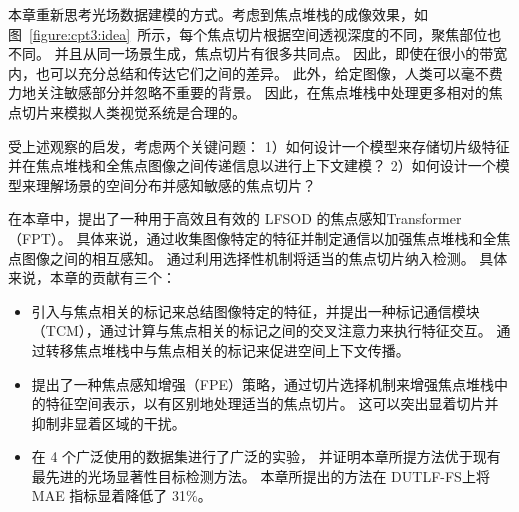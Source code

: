 本章重新思考光场数据建模的方式。考虑到焦点堆栈的成像效果，如图~\ref{figure:cpt3:idea}~所示，每个焦点切片根据空间透视深度的不同，聚焦部位也不同。 并且从同一场景生成，焦点切片有很多共同点。
因此，即使在很小的带宽内，也可以充分总结和传达它们之间的差异。 此外，给定图像，人类可以毫不费力地关注敏感部分并忽略不重要的背景。 因此，在焦点堆栈中处理更多相对的焦点切片来模拟人类视觉系统是合理的。 


受上述观察的启发，考虑两个关键问题：
1）如何设计一个模型来存储切片级特征并在焦点堆栈和全焦点图像之间传递信息以进行上下文建模？ 
2）如何设计一个模型来理解场景的空间分布并感知敏感的焦点切片？ 

在本章中，提出了一种用于高效且有效的 LFSOD 的焦点感知Transformer（FPT）。 
具体来说，通过收集图像特定的特征并制定通信以加强焦点堆栈和全焦点图像之间的相互感知。 
通过利用选择性机制将适当的焦点切片纳入检测。 
具体来说，本章的贡献有三个：



\begin{itemize}
	\item 引入与焦点相关的标记来总结图像特定的特征，并提出一种标记通信模块（TCM），通过计算与焦点相关的标记之间的交叉注意力来执行特征交互。 通过转移焦点堆栈中与焦点相关的标记来促进空间上下文传播。 
	
	\item 提出了一种焦点感知增强（FPE）策略，通过切片选择机制来增强焦点堆栈中的特征空间表示，以有区别地处理适当的焦点切片。	这可以突出显着切片并抑制非显着区域的干扰。 
	
	\item 在 4 个广泛使用的数据集进行了广泛的实验，
	并证明本章所提方法优于现有最先进的光场显著性目标检测方法。 本章所提出的方法在 DUTLF-FS上将 MAE 指标显着降低了 31\%。
\end{itemize}









